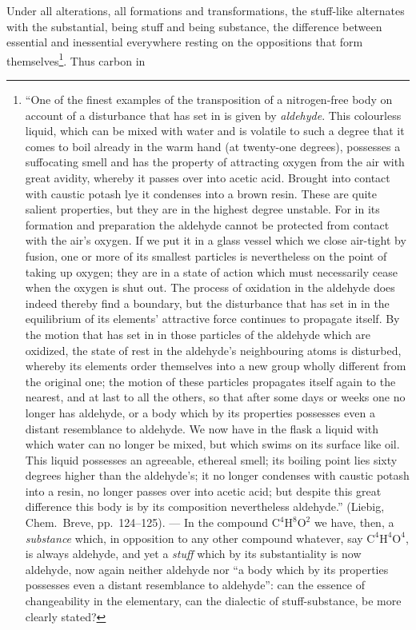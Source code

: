 \documentclass[12pt,a4paper]{book}
\begin{document}
Under all alterations, all formations and transformations, the stuff-like
alternates with the substantial, being stuff and being substance, the
difference between essential and inessential everywhere resting on the
oppositions that form themselves\footnote{``One of the finest examples of the
transposition of a nitrogen-free body on account of a disturbance that has set
in is given by \emph{aldehyde}. This colourless liquid, which can be mixed with
water and is volatile to such a degree that it comes to boil already in the
warm hand (at twenty-one degrees), possesses a suffocating smell and has the
property of attracting oxygen from the air with great avidity, whereby it
passes over into acetic acid. Brought into contact with caustic potash lye it
condenses into a brown resin. These are quite salient properties, but they are
in the highest degree unstable. For in its formation and preparation the
aldehyde cannot be protected from contact with the air's oxygen. If we put it
in a glass vessel which we close air-tight by fusion, one or more of its
smallest particles is nevertheless on the point of taking up oxygen; they are
in a state of action which must necessarily cease when the oxygen is shut out.
The process of oxidation in the aldehyde does indeed thereby find a boundary,
but the disturbance that has set in in the equilibrium of its elements'
attractive force continues to propagate itself. By the motion that has set in
in those particles of the aldehyde which are oxidized, the state of rest in the
aldehyde's neighbouring atoms is disturbed, whereby its elements order
themselves into a new group wholly different from the original one; the motion
of these particles propagates itself again to the nearest, and at last to all
the others, so that after some days or weeks one no longer has aldehyde, or a
body which by its properties possesses even a distant resemblance to aldehyde.
We now have in the flask a liquid with which water can no longer be mixed, but
which swims on its surface like oil. This liquid possesses an agreeable,
ethereal smell; its boiling point lies sixty degrees higher than the
aldehyde's; it no longer condenses with caustic potash into a resin, no longer
passes over into acetic acid; but despite this great difference this body is by
its composition nevertheless aldehyde.'' (Liebig, Chem.\ Breve, pp.~124--125).
--- In the compound $\mathrm{C}^4\mathrm{H}^8\mathrm{O}^2$ we have, then, a
\emph{substance} which, in opposition to any other compound whatever, say
$\mathrm{C}^4\mathrm{H}^4\mathrm{O}^4$, is always aldehyde, and yet a
\emph{stuff} which by its substantiality is now aldehyde, now again neither
aldehyde nor ``a body which by its properties possesses even a distant
resemblance to aldehyde'': can the essence of changeability in the elementary,
can the dialectic of stuff-substance, be more clearly stated?}. Thus carbon in
\end{document}
